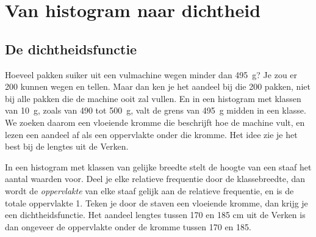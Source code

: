 \section{Van histogram naar dichtheid}

\subsection{De dichtheidsfunctie}

Hoeveel pakken suiker uit een vulmachine wegen minder dan 495~g? Je zou er 200 kunnen wegen en tellen. Maar dan ken je het aandeel bij die 200 pakken, niet bij alle pakken die de machine ooit zal vullen. En in een histogram met klassen van 10~g, zoals van 490 tot 500~g, valt de grens van 495~g midden in een klasse. We zoeken daarom een vloeiende kromme die beschrijft hoe de machine vult, en lezen een aandeel af als een oppervlakte onder die kromme. Het idee zie je het best bij de lengtes uit de Verken.

In een histogram met klassen van gelijke breedte stelt de hoogte van een staaf het aantal waarden voor. Deel je elke relatieve frequentie door de klassebreedte, dan wordt de \textit{oppervlakte} van elke staaf gelijk aan de relatieve frequentie, en is de totale oppervlakte 1. Teken je door de staven een vloeiende kromme, dan krijg je een dichtheidsfunctie. Het aandeel lengtes tussen 170 en 185 cm uit de Verken is dan ongeveer de oppervlakte onder de kromme tussen 170 en 185.


